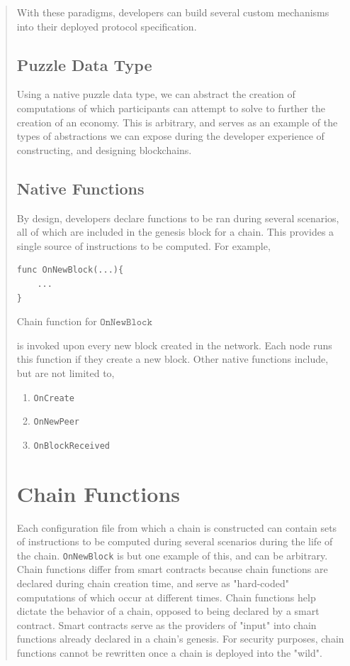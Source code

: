 \documentclass[12pt, titlepage, twocolumn]{report}
\begin{document}
\begin{quotation}
With these paradigms, developers can build several custom mechanisms into their deployed protocol specification.


\subsection{Puzzle Data Type}
Using a native puzzle data type, we can abstract the creation of computations of which participants can attempt to solve to further the creation of an economy. This is arbitrary, and serves as an example of the types of abstractions we can expose during the developer experience of constructing, and designing blockchains.


\subsection{Native Functions}

By design, developers declare functions to be ran during several scenarios, all of which are included in the genesis block for a chain. This provides a single source of instructions to be computed. For example,

\begin{listing}[ht]
\begin{minipage}{\linewidth}
\begin{lstlisting}
func OnNewBlock(...){
	...
}
\end{lstlisting}
\end{minipage}
\caption{Chain function for \(\texttt{OnNewBlock}\)}
\label{code:6}
\end{listing}

is invoked upon every new block created in the network. Each node runs this function if they create a new block. Other native functions include, but are not limited to,

\begin{enumerate}
	\item \texttt{OnCreate}
	\item \texttt{OnNewPeer}
	\item \texttt{OnBlockReceived}
\end{enumerate}

\section{Chain Functions}
Each configuration file from which a chain is constructed can contain sets of instructions to be computed during several scenarios during the life of the chain. \texttt{OnNewBlock} is but one example of this, and can be arbitrary. Chain functions differ from smart contracts because chain functions are declared during chain creation time, and serve as "hard-coded" computations of which occur at different times. Chain functions help dictate the behavior of a chain, opposed to being declared by a smart contract. Smart contracts serve as the providers of "input" into chain functions already declared in a chain's genesis. For security purposes, chain functions cannot be rewritten once a chain is deployed into the "wild".


\end{quotation}
\end{document}
